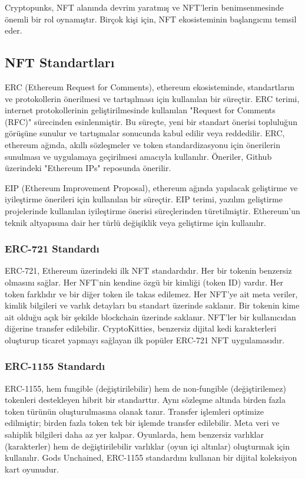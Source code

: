 Cryptopunks, NFT alanında devrim yaratmış ve NFT'lerin benimsenmesinde önemli bir rol oynamıştır. Birçok kişi için, NFT ekosisteminin başlangıcını temsil eder.

\subsection{NFT Standartları}

ERC (Ethereum Request for Comments), ethereum ekosisteminde, standartların ve protokollerin önerilmesi ve tartışılması için kullanılan bir süreçtir. ERC terimi, internet protokollerinin geliştirilmesinde kullanılan "Request for Comments (RFC)" sürecinden esinlenmiştir. Bu süreçte, yeni bir standart önerisi topluluğun görüşüne sunulur ve tartışmalar sonucunda kabul edilir veya reddedilir. ERC, ethereum ağında, akıllı sözleşmeler ve token standardizasyonu için önerilerin sunulması ve uygulamaya geçirilmesi amacıyla kullanılır. Öneriler, Github üzerindeki "Ethereum IPs" reposunda önerilir.

EIP (Ethereum Improvement Proposal), ethereum ağında yapılacak geliştirme ve iyileştirme önerileri için kullanılan bir süreçtir. EIP terimi, yazılım geliştirme projelerinde kullanılan iyileştirme önerisi süreçlerinden türetilmiştir. Ethereum'un teknik altyapısına dair her türlü değişiklik veya geliştirme için kullanılır.

\subsubsection{ERC-721 Standardı}

ERC-721, Ethereum üzerindeki ilk NFT standardıdır. Her bir tokenin benzersiz olmasını sağlar. Her NFT'nin kendine özgü bir kimliği (token ID) vardır. Her token farklıdır ve bir diğer token ile takas edilemez. Her NFT'ye ait meta veriler, kimlik bilgileri ve varlık detayları bu standart üzerinde saklanır. Bir tokenin kime ait olduğu açık bir şekilde blockchain üzerinde saklanır. NFT'ler bir kullanıcıdan diğerine transfer edilebilir. CryptoKitties, benzersiz dijital kedi karakterleri oluşturup ticaret yapmayı sağlayan ilk popüler ERC-721 NFT uygulamasıdır.

\subsubsection{ERC-1155 Standardı}

ERC-1155, hem fungible (değiştirilebilir) hem de non-fungible (değiştirilemez) tokenleri destekleyen hibrit bir standarttır. Aynı sözleşme altında birden fazla token türünün oluşturulmasına olanak tanır. Transfer işlemleri optimize edilmiştir; birden fazla token tek bir işlemde transfer edilebilir. Meta veri ve sahiplik bilgileri daha az yer kalpar. Oyunlarda, hem benzersiz varlıklar (karakterler) hem de değiştirilebilir varlıklar (oyun içi altınlar) oluşturmak için kullanılır. Gods Unchained, ERC-1155 standardını kullanan bir dijital koleksiyon kart oyunudur.

